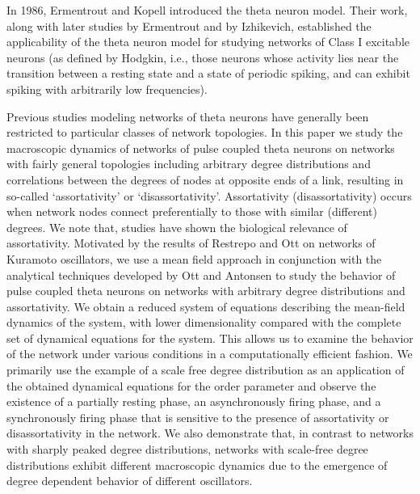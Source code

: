 \documentclass[%
 aip,
 sd,%
 amsmath,amssymb,
 reprint,%
]{revtex4-1}
\begin{document}
In 1986, Ermentrout and Kopell\cite{ermentrout1986parabolic} introduced the theta neuron model. Their work, along with later studies by Ermentrout\cite{ermentrout1996type} and by Izhikevich\cite{izhikevich1999class}, established the applicability of the theta neuron model for studying networks of Class I excitable neurons (as defined by Hodgkin,\cite{hodgkin1948local} i.e., those neurons whose activity lies near the transition between a resting state and a state of periodic spiking, and can exhibit spiking with arbitrarily low frequencies).

Previous studies modeling networks of theta neurons\cite{luke2013complete, roulet2016average, martens2009exact, borgers2003synchronization} have generally been restricted to particular classes of network topologies. In this paper we study the macroscopic dynamics of networks of pulse coupled theta neurons on networks with fairly general topologies including arbitrary degree distributions and correlations between the degrees of nodes at 	opposite ends of a link, resulting in so-called `assortativity' or `disassortativity'\cite{newman2002assortative}. Assortativity (disassortativity) occurs when network nodes connect preferentially to those with similar (different) degrees. We note that, studies\cite{hagmann2008mapping, bialonski2013assortative, barzegaran2012properties, de2009functional, teller2014emergence} have shown the biological relevance of assortativity. Motivated by the results of Restrepo and Ott\cite{restrepo2014mean} on networks of Kuramoto oscillators, we use a mean field approach in conjunction with the analytical techniques developed by Ott and Antonsen\cite{ott2008low, ott2009long, ott2011comment} to study the behavior of pulse coupled theta neurons on networks with arbitrary degree distributions and assortativity. We obtain a reduced system of equations describing the mean-field dynamics of the system, with lower dimensionality compared with the complete set of dynamical equations for the system. This allows us to examine the behavior of the network under various conditions in a computationally efficient fashion. We primarily use the example of a scale free degree distribution as an application of the obtained dynamical equations for the order parameter and observe the existence of a partially resting phase, an asynchronously firing phase, and a synchronously firing phase that is sensitive to the presence of assortativity or disassortativity in the network. We also demonstrate that, in contrast to networks with sharply peaked degree distributions, networks with scale-free degree distributions exhibit different macroscopic dynamics due to the emergence of degree dependent behavior of different oscillators. 
\end{document}
